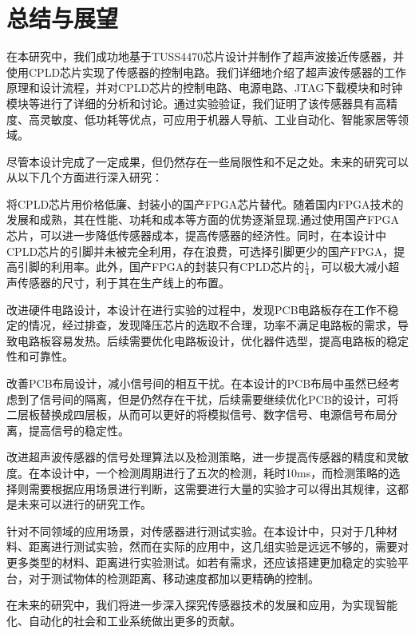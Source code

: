 \newpage
\section{总结与展望}
在本研究中，我们成功地基于TUSS4470芯片设计并制作了超声波接近传感器，并使用CPLD芯片实现了传感器的控制电路。我们详细地介绍了超声波传感器的工作原理和设计流程，并对CPLD芯片的控制电路、电源电路、JTAG下载模块和时钟模块等进行了详细的分析和讨论。通过实验验证，我们证明了该传感器具有高精度、高灵敏度、低功耗等优点，可应用于机器人导航、工业自动化、智能家居等领域。\par
尽管本设计完成了一定成果，但仍然存在一些局限性和不足之处。未来的研究可以从以下几个方面进行深入研究：\par
将CPLD芯片用价格低廉、封装小的国产FPGA芯片替代。随着国内FPGA技术的发展和成熟，其在性能、功耗和成本等方面的优势逐渐显现,通过使用国产FPGA芯片，可以进一步降低传感器成本，提高传感器的经济性。同时，在本设计中CPLD芯片的引脚并未被完全利用，存在浪费，可选择引脚更少的国产FPGA，提高引脚的利用率。此外，国产FPGA的封装只有CPLD芯片的$\frac{1}{4}$，可以极大减小超声传感器的尺寸，利于其在生产线上的布置。\par
改进硬件电路设计，本设计在进行实验的过程中，发现PCB电路板存在工作不稳定的情况，经过排查，发现降压芯片的选取不合理，功率不满足电路板的需求，导致电路板容易发热。后续需要优化电路板设计，优化器件选型，提高电路板的稳定性和可靠性。\par
改善PCB布局设计，减小信号间的相互干扰。在本设计的PCB布局中虽然已经考虑到了信号间的隔离，但是仍然存在干扰，后续需要继续优化PCB的设计，可将二层板替换成四层板，从而可以更好的将模拟信号、数字信号、电源信号布局分离，提高信号的稳定性。\par
改进超声波传感器的信号处理算法以及检测策略，进一步提高传感器的精度和灵敏度。在本设计中，一个检测周期进行了五次的检测，耗时10ms，而检测策略的选择则需要根据应用场景进行判断，这需要进行大量的实验才可以得出其规律，这都是未来可以进行的研究工作。\par
针对不同领域的应用场景，对传感器进行测试实验。在本设计中，只对于几种材料、距离进行测试实验，然而在实际的应用中，这几组实验是远远不够的，需要对更多类型的材料、距离进行实验测试。如若有需求，还应该搭建更加稳定的实验平台，对于测试物体的检测距离、移动速度都加以更精确的控制。\par
在未来的研究中，我们将进一步深入探究传感器技术的发展和应用，为实现智能化、自动化的社会和工业系统做出更多的贡献。

